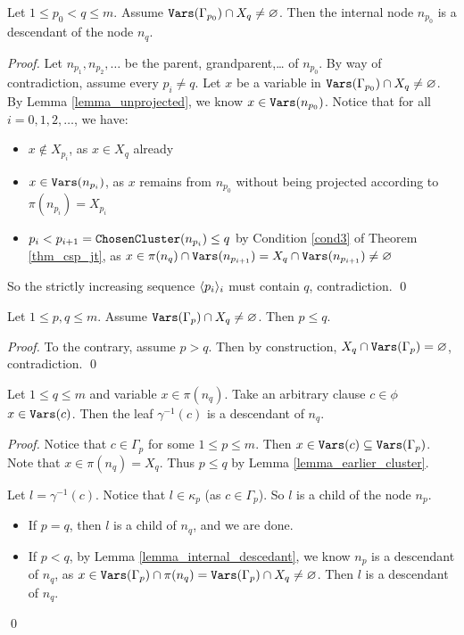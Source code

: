 \begin{lemma}
\label{lemma_internal_descedant}
    Let $1 \le p_0 < q \le m$.
    Assume $\texttt{\upshape Vars}(\Gamma_{p_0}) \cap X_q \ne \varnothing$.
    Then the internal node $n_{p_0}$ is a descendant of the node $n_q$.
\end{lemma}
\begin{proof}
    Let $n_{p_1}, n_{p_2}, \ldots$ be the parent, grandparent,\ldots{} of $n_{p_0}$.
    By way of contradiction, assume every $p_i \ne q$.
    Let $x$ be a variable in $\texttt{\upshape Vars}(\Gamma_{p_0}) \cap X_q \ne \varnothing$.
    By Lemma \ref{lemma_unprojected}, we know $x \in \texttt{\upshape Vars}(n_{p_0})$.
    Notice that for all $i = 0, 1, 2, \ldots$, we have:
    \begin{itemize}
        \item $x \notin X_{p_i}$, as $x \in X_q$ already
        \item $x \in \texttt{\upshape Vars}(n_{p_i})$, as $x$ remains from $n_{p_0}$ without being projected according to $\pi(n_{p_i}) = X_{p_i}$
        \item $p_i < p_{i + 1} = \texttt{\upshape ChosenCluster}(n_{p_i}) \le q$ by Condition \ref{cond3} of Theorem \ref{thm_csp_jt}, as $x \in \pi(n_q) \cap \texttt{\upshape Vars}(n_{p_{i+1}}) = X_q \cap \texttt{\upshape Vars}(n_{p_{i+1}}) \ne \varnothing$
    \end{itemize}
    So the strictly increasing sequence $\langle p_i \rangle_i$ must contain $q$, contradiction.
\qed
\end{proof}

\begin{lemma}
\label{lemma_earlier_cluster}
    Let $1 \le p, q \le m$.
    Assume $\texttt{\upshape Vars}(\Gamma_p) \cap X_q \ne \varnothing$.
    Then $p \le q$.
\end{lemma}
\begin{proof}
    To the contrary, assume $p > q$.
    Then by construction, $X_q \cap \texttt{\upshape Vars}(\Gamma_p) = \varnothing$, contradiction.
\qed
\end{proof}

\begin{lemma}
\label{lemma_prop2}
    Let $1 \le q \le m$ and variable $x \in \pi(n_q)$.
    Take an arbitrary clause $c \in \phi$ \st{} $x \in \texttt{\upshape Vars}(c)$.
    Then the leaf $\gamma^{-1}(c)$ is a descendant of $n_q$.
\end{lemma}
\begin{proof}
    Notice that $c \in \Gamma_p$ for some $1 \le p \le m$.
    Then $x \in \texttt{\upshape Vars}(c) \subseteq \texttt{\upshape Vars}(\Gamma_p)$.
    Note that $x \in \pi(n_q) = X_q$.
    Thus $p \le q$ by Lemma \ref{lemma_earlier_cluster}.

    Let $l = \gamma^{-1}(c)$.
    Notice that $l \in \kappa_p$ (as $c \in \Gamma_p$).
    So $l$ is a child of the node $n_p$.
    \begin{itemize}
        \item If $p = q$, then $l$ is a child of $n_q$, and we are done.
        \item If $p < q$, by Lemma \ref{lemma_internal_descedant}, we know $n_p$ is a descendant of $n_q$, as $x \in \texttt{\upshape Vars}(\Gamma_p) \cap \pi(n_q) = \texttt{\upshape Vars}(\Gamma_p) \cap X_q \ne \varnothing$.
        Then $l$ is a descendant of $n_q$.
    \end{itemize}
\qed
\end{proof}


